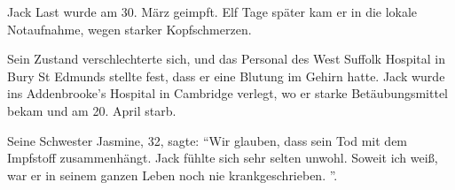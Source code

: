 Jack Last wurde am 30. März geimpft. Elf Tage später kam er in die lokale
Notaufnahme, wegen starker Kopfschmerzen.

Sein Zustand verschlechterte sich, und das Personal des West Suffolk Hospital in
Bury St Edmunds stellte fest, dass er eine Blutung im Gehirn hatte. Jack wurde
ins Addenbrooke's Hospital in Cambridge verlegt, wo er starke Betäubungsmittel
bekam und am 20. April starb.

Seine Schwester Jasmine, 32, sagte: “Wir glauben, dass sein Tod mit dem
Impfstoff zusammenhängt. Jack fühlte sich sehr selten unwohl. Soweit ich weiß,
war er in seinem ganzen Leben noch nie krankgeschrieben. ”.
